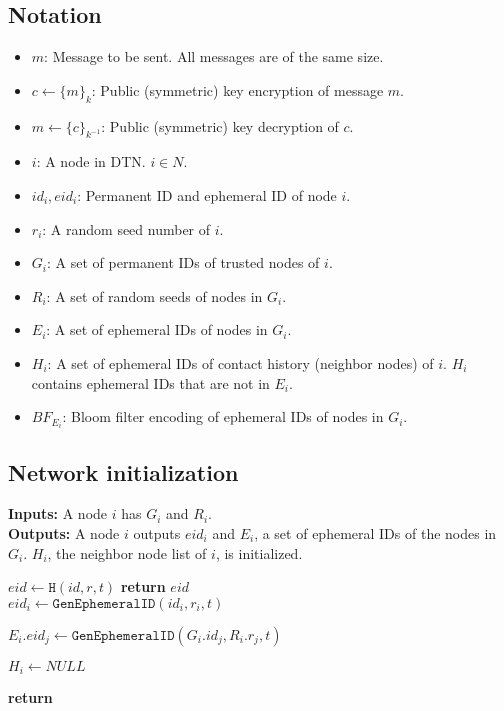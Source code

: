 \documentclass[11pt]{article}
\begin{document}
\subsection{Notation}
\begin{itemize}
\item $m$: Message to be sent. All messages are of the same size.
\item $c \leftarrow \{m\}_{k}$: Public (symmetric) key encryption of message $m$.
\item $m \leftarrow \{c\}_{k^{-1}}$: Public (symmetric) key decryption of $c$.

\item $i$: A node in DTN. $i \in N$.
\item $id_i, eid_i$: Permanent ID and ephemeral ID of node $i$.
\item $r_i$: A random seed number of $i$.

\item $G_i$: A set of permanent IDs of trusted nodes of $i$.
\item $R_i$: A set of random seeds of nodes in $G_i$.
\item $E_i$: A set of ephemeral IDs of nodes in $G_i$. %
\item $H_i$: A set of ephemeral IDs of contact history (neighbor nodes) of $i$. $H_i$ contains ephemeral IDs that are not in $E_i$. %
\item $BF_{E_i}$: Bloom filter encoding of ephemeral IDs of nodes in $G_i$.
\end{itemize}


\subsection{Network initialization}

\begin{framed}
\noindent
\textbf{Inputs:} A node $i$ has $G_i$ and $R_i$. \\

\noindent
\textbf{Outputs:} A node $i$ outputs $eid_i$ and $E_i$, a set of ephemeral IDs of the nodes in $G_i$.  $H_i$, the neighbor node list of $i$, is initialized. \\

\begin{algorithmic}[1]
    \State $eid \leftarrow \texttt{H}(id, r, t)$
    \State \textbf{return} $eid$
  \EndProcedure\\

    \State $eid_i \leftarrow \texttt{GenEphemeralID}(id_i, r_i, t)$

	  \State $E_i.eid_j \leftarrow \texttt{GenEphemeralID}(G_i.id_j, R_i.r_j, t)$
	\EndFor
	
	\State $H_i \leftarrow NULL$
    
    \State \textbf{return}  
  \EndProcedure  
\end{algorithmic}
\end{framed}
\end{document}
